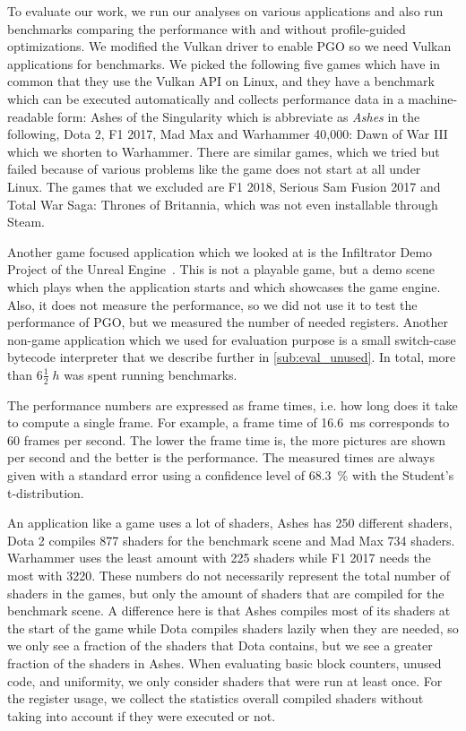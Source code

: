 \clearpage
{}
To evaluate our work, we run our analyses on various applications and also run benchmarks comparing the performance with and without profile-guided optimizations.
We modified the Vulkan driver to enable PGO so we need Vulkan applications for benchmarks.
We picked the following five games which have in common that they use the Vulkan API on Linux, and they have a benchmark which can be executed automatically and collects performance data in a machine-readable form:
Ashes of the Singularity which is abbreviate as \emph{Ashes} in the following, Dota 2, F1 2017, Mad Max and Warhammer 40,000: Dawn of War III which we shorten to Warhammer.
There are similar games, which we tried but failed because of various problems like the game does not start at all under Linux.
The games that we excluded are F1 2018, Serious Sam Fusion 2017 and Total War Saga: Thrones of Britannia, which was not even installable through Steam.

Another game focused application which we looked at is the Infiltrator Demo Project of the Unreal Engine~\cite{Games2015}.
This is not a playable game, but a demo scene which plays when the application starts and which showcases the game engine.
Also, it does not measure the performance, so we did not use it to test the performance of PGO, but we measured the number of needed registers.
Another non-game application which we used for evaluation purpose is a small switch-case bytecode interpreter that we describe further in \cref{sub:eval_unused}.
In total, more than $6 \frac{1}{2}\;\si{h}$ was spent running benchmarks.

The performance numbers are expressed as frame times, i.e. how long does it take to compute a single frame.
For example, a frame time of \SI{16.6}{\milli\second} corresponds to 60 frames per second.
The lower the frame time is, the more pictures are shown per second and the better is the performance.
The measured times are always given with a standard error using a confidence level of \SI{68.3}{\percent} with the Student's t-distribution.

An application like a game uses a lot of shaders, Ashes has 250 different shaders, Dota 2 compiles 877 shaders for the benchmark scene and Mad Max 734 shaders.
Warhammer uses the least amount with 225 shaders while F1 2017 needs the most with 3220.
These numbers do not necessarily represent the total number of shaders in the games, but only the amount of shaders that are compiled for the benchmark scene.
A difference here is that Ashes compiles most of its shaders at the start of the game while Dota compiles shaders lazily when they are needed, so we only see a fraction of the shaders that Dota contains, but we see a greater fraction of the shaders in Ashes.
When evaluating basic block counters, unused code, and uniformity, we only consider shaders that were run at least once.
For the register usage, we collect the statistics overall compiled shaders without taking into account if they were executed or not.

